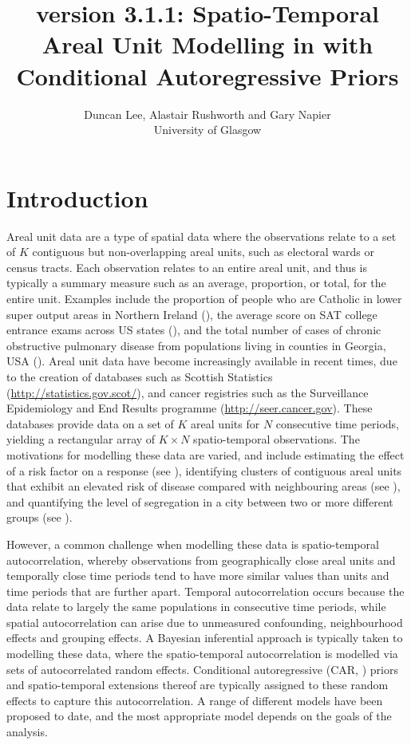 \documentclass[article, nojss]{jss}
\author{Duncan Lee, Alastair Rushworth and Gary Napier
\\University of Glasgow}
\title{\pkg{CARBayesST} version 3.1.1: Spatio-Temporal Areal Unit Modelling in \proglang{R} with Conditional Autoregressive Priors}
\begin{document}





\section{Introduction}
Areal unit data are a type of spatial data where the observations relate to a set of $K$ contiguous but non-overlapping areal units, such as electoral wards or census tracts. Each observation relates to an entire areal unit, and thus is typically a summary measure such as an average, proportion, or total, for the entire unit. Examples include the proportion of people who are Catholic in lower super output areas in Northern Ireland (\citealp{lee2015}), the average score on SAT college entrance exams across US states (\citealp{wall2004}), and the total number of cases of chronic obstructive pulmonary disease from populations living in counties in Georgia, USA (\citealp{choiENV11}). Areal unit data have become increasingly available in recent times, due to the creation of databases such as Scottish Statistics (\url{http://statistics.gov.scot/}), and cancer registries such as the Surveillance Epidemiology and End Results programme (\url{http://seer.cancer.gov}). These databases provide data on a set of $K$ areal units for $N$ consecutive time periods, yielding a rectangular array of $K\times N$ spatio-temporal observations. The motivations for modelling these data are varied, and include estimating the effect of a risk factor on a response (see \citealp{wakefield2007}), identifying clusters of contiguous areal units that exhibit an elevated risk of disease compared with neighbouring areas (see \citealp{anderson2014}), and quantifying the level of segregation in a city between two or more different groups (see \citealp{lee2015}). 
 

\hspace{1cm} However, a common challenge when modelling these data is spatio-temporal autocorrelation, whereby observations from geographically close areal units and temporally close time periods tend to have more similar values than units and time periods that are further apart. Temporal autocorrelation occurs because the data relate to largely the same populations in consecutive time periods, while spatial autocorrelation can arise due to unmeasured confounding, neighbourhood effects and grouping effects. A Bayesian inferential approach is typically taken to modelling these data, where the spatio-temporal autocorrelation is modelled via sets of autocorrelated random effects. Conditional autoregressive (CAR, \citealp{besag1991}) priors and spatio-temporal extensions thereof  are typically assigned to these random effects to capture this autocorrelation.  A range of different models have been proposed to date, and the most appropriate model depends on the goals of the analysis.
\end{document}

